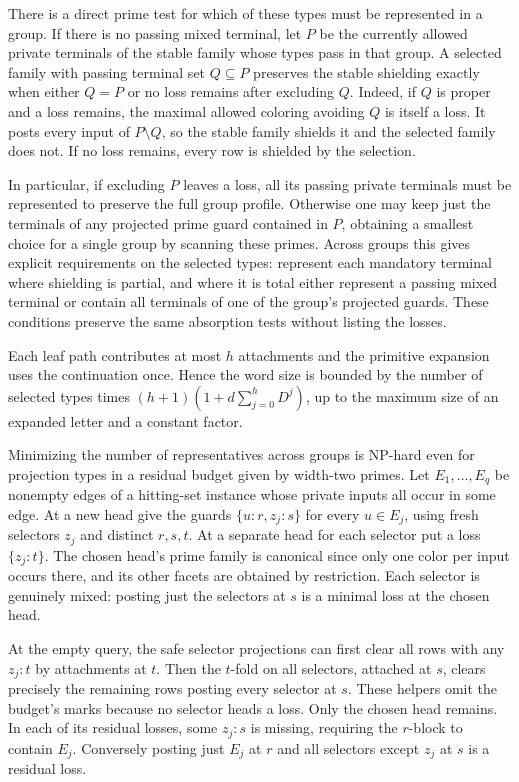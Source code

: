 There is a direct prime test for which of these types
must be represented in a group. If there is no
passing mixed terminal, let $P$ be the currently
allowed private terminals of the stable family whose
types pass in that group. A selected family with passing terminal
set $Q\subseteq P$ preserves the stable shielding
exactly when either $Q=P$ or no loss remains after
excluding $Q$. Indeed, if $Q$ is proper and a loss
remains, the maximal allowed coloring avoiding $Q$
is itself a loss. It posts every input of $P\setminus
Q$, so the stable family shields it and the selected
family does not. If no loss remains, every row is
shielded by the selection.

In particular, if excluding $P$ leaves a loss, all
its passing private terminals must be represented
to preserve the full group profile. Otherwise one
may keep just the terminals of any projected prime
guard contained in $P$, obtaining a smallest
choice for a single group by scanning these primes.
Across groups this gives explicit requirements on
the selected types: represent each mandatory
terminal where shielding is partial, and where it
is total either represent a passing mixed terminal
or contain all terminals of one of the group's
projected guards. These conditions preserve the
same absorption tests without listing the losses.

Each leaf path contributes at most $h$ attachments
and the primitive expansion uses the continuation
once. Hence the word size is bounded by the number
of selected types times
$(h+1)(1+d\sum_{j=0}^h D^j)$, up to the maximum
size of an expanded letter and a constant factor.

Minimizing the number of representatives across groups
is NP-hard even for projection types in a residual
budget given by width-two primes. Let $E_1,\ldots,E_q$
be nonempty edges of a hitting-set instance whose
private inputs all occur in some edge. At a new head
give the guards
$\{u:r,z_j:s\}$ for every $u\in E_j$, using fresh
selectors $z_j$ and distinct $r,s,t$. At a separate
head for each selector put a loss $\{z_j:t\}$.
The chosen head's prime family is canonical since
only one color per input occurs there, and its other
facets are obtained by restriction. Each selector
is genuinely mixed: posting just the selectors at
$s$ is a minimal loss at the chosen head.

At the empty query, the safe selector projections
can first clear all rows with any $z_j:t$ by
attachments at $t$. Then the $t$-fold on all selectors,
attached at $s$, clears precisely the remaining rows
posting every selector at $s$. These helpers omit the
budget's marks because no selector heads a loss.
Only the chosen head remains. In each of its residual
losses, some $z_j:s$ is missing, requiring the
$r$-block to contain $E_j$. Conversely posting just
$E_j$ at $r$ and all selectors except $z_j$ at $s$
is a residual loss.

